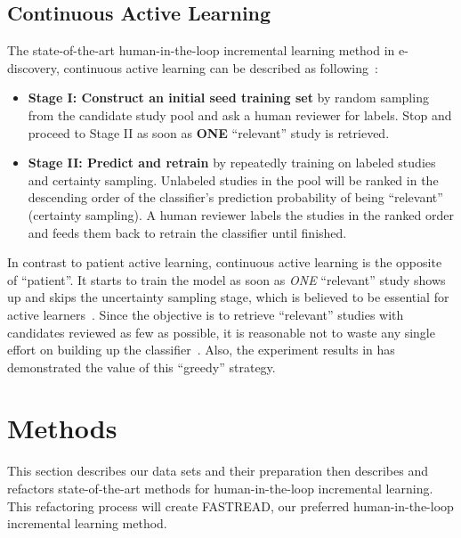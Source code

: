 \documentclass[final,twocolumn,5p]{elsarticle}
\theoremstyle{break}
\begin{document}
\subsection{Continuous Active Learning}
\label{sect: Continuous Active Learning}

The state-of-the-art human-in-the-loop incremental learning method in e-discovery, continuous active learning can be described as following~\cite{cormack2014evaluation,cormack2015autonomy,tredennick2015}:

\begin{itemize}

\item
{\bf Stage I: Construct an initial seed training set} by random sampling from the candidate study pool and ask a human reviewer for labels. Stop and proceed to Stage II as soon as \textbf{ONE} ``relevant'' study is retrieved.

\item
{\bf Stage II: Predict and retrain} by repeatedly training on labeled studies and certainty sampling. Unlabeled studies in the pool will be ranked in the descending order of the classifier's prediction probability of being ``relevant'' (certainty sampling). A human reviewer labels the studies in the ranked order and feeds them back to retrain the classifier until finished.

\end{itemize}

In contrast to patient active learning, continuous active learning is the opposite of ``patient''. It starts to train the model as soon as \textit{ONE} ``relevant'' study shows up and skips the uncertainty sampling stage, which is believed to be essential for active learners~\cite{settles2012active}. Since the objective is to retrieve ``relevant'' studies with candidates reviewed as few as possible, it is reasonable not to waste any single effort on building up the classifier~\cite{cormack2014evaluation,tredennick2015}. Also, the experiment results in \cite{cormack2014evaluation} has demonstrated the value of this ``greedy'' strategy.




\section{Methods}
\label{sect: Method}

This section describes our data sets and their preparation then describes and refactors state-of-the-art methods for human-in-the-loop incremental learning.
This refactoring process will create FASTREAD, our preferred human-in-the-loop incremental learning
method. 
\end{document}
